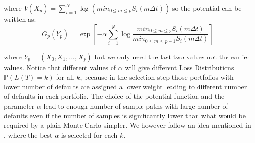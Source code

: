 where $V(X_p) = \sum_{i=1}^N \log (min_{0\leq m  \leq p}S_{i}(m \Delta t))$ 
so the potential can be written as:
\begin{equation}
	G_{p}(Y_{p})= \exp\left[ -\alpha \sum_{i=1}^{N}\log\frac{min_{0\leq m  \leq p}
		S_{i}(m \Delta t)}{min_{0\leq m  \leq p - 1}S_{i}(m \Delta t)}\right]
\end{equation}

where $Y_{p} =(X_{0},X_{1},...,X_{p})$ but we only need the last two values 
not the earlier values. Notice that different values of $\alpha$ will give 
different Loss Distributions $\mathbb{P}(L(T) = k)$ for all $k$, because in 
the selection step those portfolios with lower number of defaults are assigned 
a lower weight leading to different number of defaults in each portfolio. The 
choice of the potential function and the parameter $\alpha$ lead to enough 
number of sample paths with large number of defaults even if the number of 
samples is significantly lower than what would be required by a plain Monte 
Carlo simpler. We however follow an idea mentioned in 
\cite{carmona2009importance}, where the best $\alpha$ is selected for each $k$.
